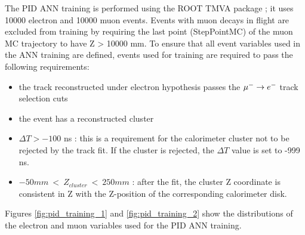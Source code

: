 The PID ANN training is performed using the ROOT TMVA package ; it uses 10000 electron and 10000 muon events.
Events with muon decays in flight are excluded from training by requiring the last point (StepPointMC)
of the muon MC trajectory to have Z > 10000 mm.
%
To ensure that all event variables used in the ANN training are defined, events used for training
are required to pass the following requirements:

\begin{itemize}
\item 
  the track reconstructed under electron hypothesis passes the $\mbox{$\mu^- \rightarrow e^-$}$ track selection cuts
\item 
  the event has a reconstructed cluster 
\item 
  $\Delta T > -100$ ns : this is a requirement for the calorimeter cluster not to be rejected by the track fit.
  If the cluster is rejected, the $\Delta T$ value is set to -999 ns.
\item
  $-50 mm ~<~ Z_{cluster} ~<~ 250 mm$ : after the fit, the cluster Z coordinate is consistent in Z with the
  Z-position of the corresponding calorimeter disk.
\end{itemize}

Figures \ref{fig:pid_training_1} and \ref{fig:pid_training_2} show the distributions of the electron
and muon variables used for the PID ANN training.

